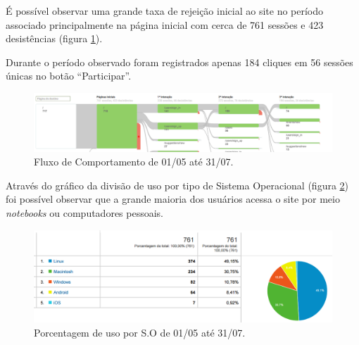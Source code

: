 \par É possível observar uma grande taxa de rejeição inicial ao site no período associado principalmente na página inicial com cerca de 761 sessões e 423 desistências (figura \ref{fig:analytics_1ainteracao_fluxo}).
\par Durante o período observado foram registrados apenas 184 cliques em 56 sessões únicas no botão ``Participar''.
\begin{figure}[htb]
\centering
\includegraphics[width=15cm]{figuras/analytics_1ainteracao_fluxo}
\caption{\label{fig:analytics_1ainteracao_fluxo} Fluxo de Comportamento de 01/05 até 31/07.}
\end{figure}
\par Através do gráfico da divisão de uso por tipo de Sistema Operacional (figura \ref{fig:analytics_1interacao_so}) foi possível observar que a grande maioria dos usuários acessa o site por meio \emph{notebooks} ou computadores pessoais.
\begin{figure}[htb]
\centering
\includegraphics[width=15cm]{figuras/analytics_1interacao_so}
\caption{\label{fig:analytics_1interacao_so} Porcentagem de uso por S.O de 01/05 até 31/07.}
\end{figure}
